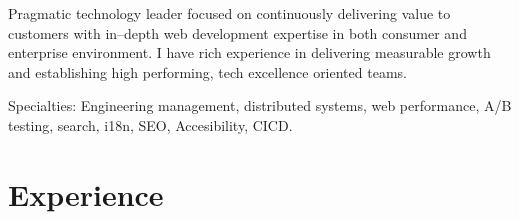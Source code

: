 \documentclass[11pt,a4paper,roman]{moderncv}       %
\begin{document}
\makecvtitle


\small{Pragmatic technology leader focused on continuously delivering value to customers with in--depth web development expertise in both consumer and enterprise environment. I have rich experience in delivering measurable growth and establishing high performing, tech excellence oriented teams.}

\bigskip

\small{Specialties: Engineering management, distributed systems, web performance, A/B testing, search, i18n, SEO, Accesibility, CICD.}



\section{Experience}

\end{document}
